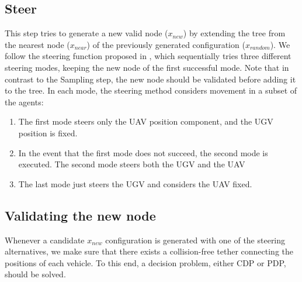 

\subsection{Steer}

\label{sec:steering}

This step tries to generate a new valid node ($x_{new}$) by extending the tree from the nearest node ($x_{near}$) of the previously generated  configuration ($x_{random}$). We follow the steering function proposed in \cite{smartinezr2023}, which sequentially tries three different steering modes, keeping the new node of the first successful mode. Note that in contrast to the Sampling step, the new node should be validated before adding it to the tree. In each mode, the steering method considers movement in a subset of the agents:

\begin{enumerate}
    \item The first mode steers only the UAV position component, and the UGV position is fixed. 
    \item In the event that the first mode does not succeed, the second mode is executed. The second mode steers both the UGV and the UAV
    \item The last mode just steers the UGV and considers the UAV fixed.  
\end{enumerate}

\subsection{Validating the new node}

Whenever a candidate $x_{new}$ configuration is generated with one of the steering alternatives, we make sure that there exists a collision-free tether connecting the positions of each vehicle. To this end, a decision problem, either CDP or PDP, should be solved. 



